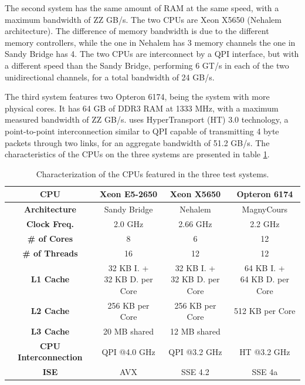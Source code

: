 The second system has the same amount of RAM at the same speed, with a maximum bandwidth of ZZ GB/s. The two CPUs are \intel Xeon X5650 (Nehalem architecture). The difference of memory bandwidth is due to the different memory controllers, while the one in Nehalem has 3 memory channels the one in Sandy Bridge has 4. The two CPUs are interconnect by a QPI interface, but with a different speed than the Sandy Bridge, performing 6 GT/s in each of the two unidirectional channels, for a total bandwidth of 24 GB/s.

The third system features two \amd Opteron 6174, being the system with more physical cores. It has 64 GB of DDR3 RAM at 1333 MHz, with a maximum measured bandwidth of ZZ GB/s. \amd uses HyperTransport (HT) 3.0 technology, a point-to-point interconnection similar to QPI capable of transmitting 4 byte packets through two links, for an aggregate bandwidth of 51.2 GB/s. The characteristics of the CPUs on the three systems are presented in table \ref{tab:CPUS}.

\begin{table}[!htp]
	\begin{center}
		\begin{tabular}{|c|c|c|c|}
			\hline
			\textbf{CPU} & \intel Xeon E5-2650 & \intel Xeon X5650 & \amd Opteron 6174 \\ \hline
			\textbf{Architecture} & Sandy Bridge & Nehalem & Magny\-Cours \\ \hline
			\textbf{Clock Freq.} & 2.0 GHz & 2.66 GHz & 2.2 GHz \\ \hline
			\textbf{\# of Cores} & 8 & 6 & 12 \\ \hline
			\textbf{\# of Threads} & 16 & 12 & 12 \\ \hline
			\textbf{L1 Cache} & \specialcell{32 KB I. +\\32 KB D. per Core} & \specialcell{32 KB I. +\\32 KB D. per Core} & \specialcell{64 KB I. +\\64 KB D. per Core} \\ \hline
			\textbf{L2 Cache} & 256 KB per Core & 256 KB per Core & 512 KB per Core \\ \hline
			\textbf{L3 Cache} & 20 MB shared & 12 MB shared & \- \\ \hline
			\textbf{CPU Interconnection} & QPI @4.0 GHz & QPI @3.2 GHz & HT @3.2 GHz \\ \hline
			\textbf{ISE} & AVX & SSE 4.2 & SSE 4a \\
			\hline
		\end{tabular}
		\caption{Characterization of the CPUs featured in the three test systems.}
		\label{tab:CPUS}
	\end{center}
\end{table}

